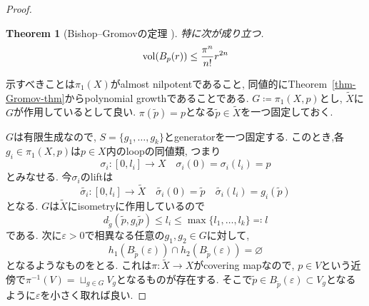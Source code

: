 \documentclass[dvipdfmx,a4paper,11pt]{article} %
\newtheorem{thm}{Theorem}[section]
\theoremstyle{definition}
\theoremstyle{remark}
\numberwithin{equation}{section}
\newcommand{\vol}{{\rm vol}}
\begin{document}
\begin{proof}
\begin{thm}[Bishop--Gromovの定理 {\cite[Corollary 3.3]{Zhu97}}]
特に次が成り立つ. 
\[
\vol(B_p(r))\leq \frac{\pi^n}{n!} r^{2n}
\]
\end{thm}

示すべきことは$\pi_1(X)$がalmost nilpotentであること, 同値的にTheorem~\ref{thm-Gromov-thm}からpolynomial growthであることである. 
$G\coloneqq \pi_1(X, p)$とし, $\widetilde{X}$に$G$が作用しているとして良い. 
$\pi(\widetilde{p})=p$となる$\widetilde{p} \in \widetilde{X}$を一つ固定しておく. 

$G$は有限生成なので, $S =\{ g_1, \ldots, g_k\}$とgeneratorを一つ固定する. 
このとき,各$g_i \in \pi_1(X, p)$は$p \in X$内のloopの同値類, つまり
\[
\sigma_i \colon [0, l_i] \to X
\quad
\sigma_i(0)=\sigma_i(l_i)=p
\]
とみなせる. 
今$\sigma_i$のliftは
\[
\widetilde{\sigma_i} \colon [0, l_i] \to \widetilde{X}
\quad
\widetilde{\sigma_i}(0)=\widetilde{p}
\quad
\widetilde{\sigma_i}(l_i)=g_i(\widetilde{p})
\]
となる. $G$は$\widetilde{X}$にisometryに作用しているので
\begin{equation}
\label{eq-length-evaluate}
d_{\widetilde{g}}(\widetilde{p}, g_i \widetilde{p}) \leq 
l_i \leq \max\{l_1,\ldots,l_k\} \eqqcolon l
\end{equation}
である. 
次に$\varepsilon>0$で相異なる任意の$g_1,g_2\in G$に対して,
\begin{equation}
\label{eq-disjoint-h}
h_1(B_{\widetilde p}(\varepsilon))
\cap
h_2(B_{\widetilde p}(\varepsilon))
=
\varnothing
\end{equation}
となるようなものをとる. 
これは$\pi \colon \widetilde{X} \to X$がcovering mapなので, 
$p \in V$という近傍で$\pi^{-1}(V)=\sqcup_{g \in G}V_g$となるものが存在する. 
そこで$\widetilde{p} \in B_{\widetilde p}(\varepsilon) \subset V_g$となるように$\varepsilon$を小さく取れば良い. 


\end{proof}
\end{document}
